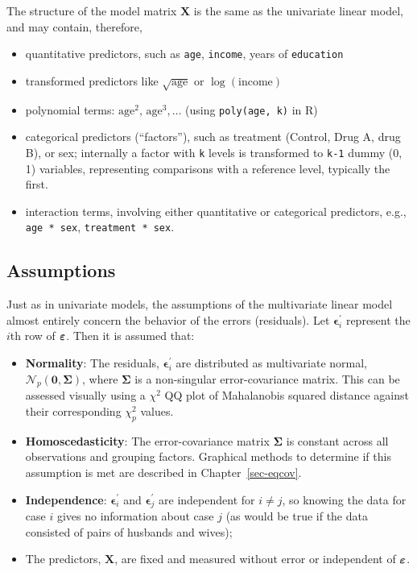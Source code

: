 \documentclass[
  letterpaper,
  10pt,
  krantz2]{krantz}
\providecommand{\tightlist}{%
  \setlength{\itemsep}{0pt}\setlength{\parskip}{0pt}}\usepackage{longtable,booktabs,array}
\begin{document}
{The structure of the model matrix \(\mathbf{X}\) is the same as the
univariate linear model, and may contain, therefore,

\begin{itemize}
\tightlist
\item
  quantitative predictors, such as \texttt{age}, \texttt{income}, years
  of \texttt{education}
\item
  transformed predictors like \(\sqrt{\text{age}}\) or
  \(\log{(\text{income})}\)
\item
  polynomial terms: \(\text{age}^2\), \(\text{age}^3, \dots\) (using
  \texttt{poly(age,\ k)} in R)
\item
  categorical predictors (``factors''), such as treatment (Control, Drug
  A, drug B), or sex; internally a factor with \texttt{k} levels is
  transformed to \texttt{k-1} dummy (0, 1) variables, representing
  comparisons with a reference level, typically the first.
\item
  interaction terms, involving either quantitative or categorical
  predictors, e.g., \texttt{age\ *\ sex}, \texttt{treatment\ *\ sex}.
\end{itemize}

\subsection{Assumptions}\label{assumptions}

Just as in univariate models, the assumptions of the multivariate linear
model almost entirely concern the behavior of the errors (residuals).
Let \(\mathbf{\epsilon}_{i}^{\prime}\) represent the \(i\)th row of
\(\boldsymbol{\Large\varepsilon}\). Then it is assumed that:

\begin{itemize}
\tightlist
\item
  \textbf{Normality}: The residuals, \(\mathbf{\epsilon}_{i}^{\prime}\)
  are distributed as multivariate normal,
  \(\mathcal{N}_{p}(\mathbf{0},\boldsymbol{\Sigma})\), where
  \(\mathbf{\Sigma}\) is a non-singular error-covariance matrix. This
  can be assessed visually using a \(\chi^2\) QQ plot of Mahalanobis
  squared distance against their corresponding \(\chi^2_p\) values.
\item
  \textbf{Homoscedasticity}: The error-covariance matrix
  \(\mathbf{\Sigma}\) is constant across all observations and grouping
  factors. Graphical methods to determine if this assumption is met are
  described in Chapter~\ref{sec-eqcov}.
\item
  \textbf{Independence}: \(\mathbf{\epsilon}_{i}^{\prime}\) and
  \(\mathbf{\epsilon}_{j}^{\prime}\) are independent for \(i\neq j\), so
  knowing the data for case \(i\) gives no information about case \(j\)
  (as would be true if the data consisted of pairs of husbands and
  wives);
\item
  The predictors, \(\mathbf{X}\), are fixed and measured without error
  or independent of \(\boldsymbol{\Large\varepsilon}\).
\end{itemize}

}
\end{document}

